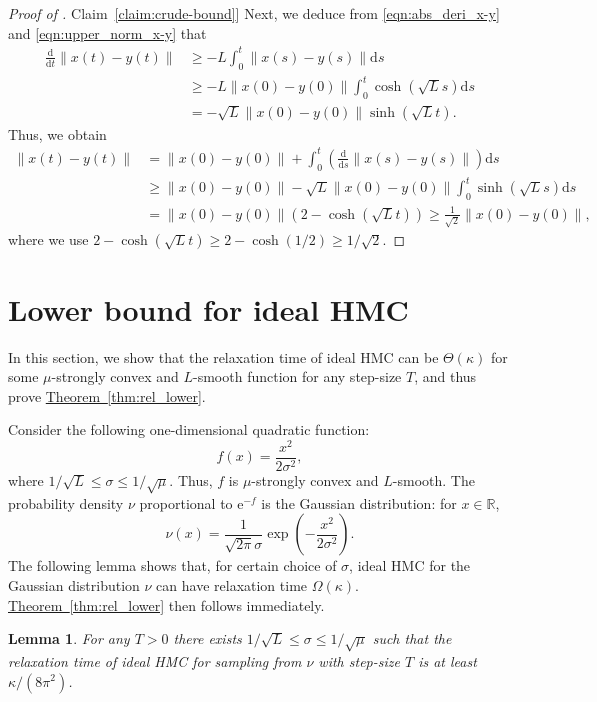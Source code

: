 \documentclass[11pt]{article}
\numberwithin{equation}{section}
\newtheorem{lemma}[theorem]{Lemma}
\theoremstyle{definition}
\theoremstyle{plain}
\newcommand{\R}{\mathbb R}
\newcommand{\eee}{\mathrm e}
\newcommand{\expref}[2]{\hyperref[#2]{#1~\ref{#2}}}
\newcommand{\dif}{\mathrm{d}}
\newcommand{\norm}[1]{\left\lVert #1 \right\rVert}
\begin{document}
\begin{proof}[Proof of \expref{Claim}{claim:crude-bound}]
	Next, we deduce from \eqref{eqn:abs_deri_x-y} and \eqref{eqn:upper_norm_x-y} that
	\begin{align*}
		\frac{\dif}{\dif t} \norm{x(t)-y(t)} 
		&\ge - L \int_{0}^t \norm{x(s)-y(s)} \dif s\\ 
		&\ge - L \norm{x(0) - y(0)} \int_{0}^t  \cosh\left( \sqrt{L}s \right) \dif s\\ 
		&= - \sqrt{L} \norm{x(0) - y(0)} \sinh\left( \sqrt{L} t \right).
	\end{align*}
	Thus, we obtain
	\begin{align*}
		\norm{x(t)-y(t)} &= \norm{x(0) - y(0)} + \int_{0}^t \left( \frac{\dif}{\dif s} \norm{x(s)-y(s)} \right) \dif s\\ 
		&\ge \norm{x(0) - y(0)} - \sqrt{L} \norm{x(0) - y(0)} \int_{0}^t \sinh\left( \sqrt{L} s \right) \dif s\\
		&= \norm{x(0) - y(0)} \left( 2 - \cosh\left( \sqrt{L} t \right) \right) \ge \frac{1}{\sqrt{2}} \norm{x(0) - y(0)},
	\end{align*}
	where we use $2 - \cosh(\sqrt{L} t) \ge 2- \cosh(1/2) \ge 1/\sqrt{2}$.
\end{proof}



\section{Lower bound for ideal HMC}
In this section, we show that the relaxation time of ideal HMC can be $\Theta(\kappa)$ for some $\mu$-strongly convex and $L$-smooth function for any step-size $T$, and thus prove \expref{Theorem}{thm:rel_lower}. 

Consider the following one-dimensional quadratic function:
\begin{equation}
%
f(x) = \frac{x^2}{2 \sigma^2},
\end{equation}
where $1/\sqrt{L} \le \sigma \le 1/\sqrt{\mu}$. 
Thus, $f$ is $\mu$-strongly convex and $L$-smooth. The probability density $\nu$ proportional to $\eee^{-f}$ is the Gaussian distribution: for $x\in \R$, 
\begin{equation}
%
\nu(x) = \frac{1}{\sqrt{2\pi} \sigma} \exp\left( - \frac{x^2}{2\sigma^2} \right).
\end{equation}
The following lemma shows that, for certain choice of $\sigma$,
ideal HMC for the Gaussian distribution $\nu$ can have relaxation time $\Omega(\kappa)$. 
\expref{Theorem}{thm:rel_lower} then follows immediately.


\begin{lemma}
	For any $T > 0$ there exists $1/\sqrt{L} \le \sigma \le 1/\sqrt{\mu}$ such that the relaxation time of ideal HMC for sampling from $\nu$ with step-size $T$ is at least $\kappa/(8\pi^2)$.
\end{lemma}
%
\end{document}
